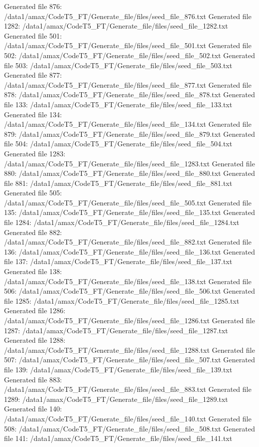 Generated file 876: /data1/amax/CodeT5_FT/Generate_file/files/seed_file_876.txt
Generated file 1282: /data1/amax/CodeT5_FT/Generate_file/files/seed_file_1282.txt
Generated file 501: /data1/amax/CodeT5_FT/Generate_file/files/seed_file_501.txt
Generated file 502: /data1/amax/CodeT5_FT/Generate_file/files/seed_file_502.txt
Generated file 503: /data1/amax/CodeT5_FT/Generate_file/files/seed_file_503.txt
Generated file 877: /data1/amax/CodeT5_FT/Generate_file/files/seed_file_877.txt
Generated file 878: /data1/amax/CodeT5_FT/Generate_file/files/seed_file_878.txt
Generated file 133: /data1/amax/CodeT5_FT/Generate_file/files/seed_file_133.txt
Generated file 134: /data1/amax/CodeT5_FT/Generate_file/files/seed_file_134.txt
Generated file 879: /data1/amax/CodeT5_FT/Generate_file/files/seed_file_879.txt
Generated file 504: /data1/amax/CodeT5_FT/Generate_file/files/seed_file_504.txt
Generated file 1283: /data1/amax/CodeT5_FT/Generate_file/files/seed_file_1283.txt
Generated file 880: /data1/amax/CodeT5_FT/Generate_file/files/seed_file_880.txt
Generated file 881: /data1/amax/CodeT5_FT/Generate_file/files/seed_file_881.txt
Generated file 505: /data1/amax/CodeT5_FT/Generate_file/files/seed_file_505.txt
Generated file 135: /data1/amax/CodeT5_FT/Generate_file/files/seed_file_135.txt
Generated file 1284: /data1/amax/CodeT5_FT/Generate_file/files/seed_file_1284.txt
Generated file 882: /data1/amax/CodeT5_FT/Generate_file/files/seed_file_882.txt
Generated file 136: /data1/amax/CodeT5_FT/Generate_file/files/seed_file_136.txt
Generated file 137: /data1/amax/CodeT5_FT/Generate_file/files/seed_file_137.txt
Generated file 138: /data1/amax/CodeT5_FT/Generate_file/files/seed_file_138.txt
Generated file 506: /data1/amax/CodeT5_FT/Generate_file/files/seed_file_506.txt
Generated file 1285: /data1/amax/CodeT5_FT/Generate_file/files/seed_file_1285.txt
Generated file 1286: /data1/amax/CodeT5_FT/Generate_file/files/seed_file_1286.txt
Generated file 1287: /data1/amax/CodeT5_FT/Generate_file/files/seed_file_1287.txt
Generated file 1288: /data1/amax/CodeT5_FT/Generate_file/files/seed_file_1288.txt
Generated file 507: /data1/amax/CodeT5_FT/Generate_file/files/seed_file_507.txt
Generated file 139: /data1/amax/CodeT5_FT/Generate_file/files/seed_file_139.txt
Generated file 883: /data1/amax/CodeT5_FT/Generate_file/files/seed_file_883.txt
Generated file 1289: /data1/amax/CodeT5_FT/Generate_file/files/seed_file_1289.txt
Generated file 140: /data1/amax/CodeT5_FT/Generate_file/files/seed_file_140.txt
Generated file 508: /data1/amax/CodeT5_FT/Generate_file/files/seed_file_508.txt
Generated file 141: /data1/amax/CodeT5_FT/Generate_file/files/seed_file_141.txt
